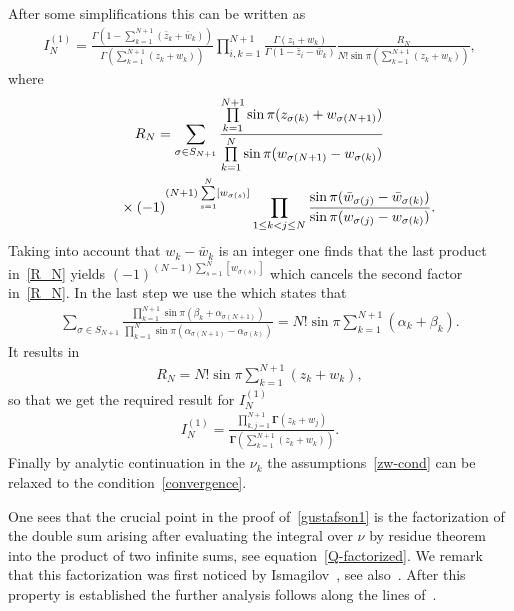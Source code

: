 \documentclass[pdftex]{sigma}
\numberwithin{equation}{section}
\begin{document}
After some simplifications this can be written as
\begin{gather*}
I_N^{(1)}=\frac{\Gamma\left(1-\sum\limits_{k=1}^{N+1}(\bar z_k+\bar w_k)\right)}{\Gamma\left(\sum\limits_{k=1}^{N+1}( z_k+ w_k)\right)}
\prod_{i,k=1}^{N+1}\frac{\Gamma(z_i+w_k)}{\Gamma(1-\bar z_i-\bar w_k)}
\frac{ R_N}{N!\sin\pi\left(\sum\limits_{k=1}^{N+1}( z_k+ w_k)\right)},
\end{gather*}
where
\begin{gather}
R_N = \sum_{\sigma\in S_{N+1}}
\frac{\prod\limits_{k=1}^{N+1}
\sin\pi(z_{\sigma(k)}+w_{\sigma(N+1)})}
{\prod\limits_{k=1}^N\sin\pi(w_{\sigma(N+1)}-w_{\sigma(k)})}
\nonumber\\
\hphantom{R_N =}{} \times(-1)^{(N+1)\sum\limits_{s=1}^N[w_{\sigma(s)}]}\prod_{1\leq k<j\leq N}
\frac{\sin\pi(\bar w_{\sigma(j)}-\bar w_{\sigma(k)})}{\sin\pi( w_{\sigma(j)}- w_{\sigma(k)})} .\label{R_N}
\end{gather}
Taking into account that $w_k-\bar w_k$ is an integer one finds that the last product in~\eqref{R_N} yields $(-1)^{(N-1)\sum\limits_{s=1}^N [w_{\sigma(s)}]}$ which cancels the second factor in~\eqref{R_N}. In the last step we use the \cite[Lemma~5.10]{Gustafson94} which states that
\begin{gather*}
\sum_{\sigma\in S_{N+1}}
\frac{\prod\limits_{k=1}^{N+1}
\sin\pi(\beta_{k}+\alpha_{\sigma(N+1)})}
{\prod\limits_{k=1}^N\sin\pi(\alpha_{\sigma(N+1)}-\alpha_{\sigma(k)})} =
N!\sin\pi \sum_{k=1}^{N+1}(\alpha_k+\beta_k).
\end{gather*}
It results in
\begin{gather*}
R_N=N!\sin\pi \sum_{k=1}^{N+1}( z_k+ w_k),
\end{gather*}
so that we get the required result for $I_N^{(1)}$
 \begin{gather*}
I_N^{(1)}=\frac{\prod\limits_{k,j=1}^{N+1}\boldsymbol{\Gamma}(z_k+ w_j)}{
\boldsymbol{\Gamma}\left(\sum\limits_{k=1}^{N+1} (z_k+w_k) \right)} .
\end{gather*}
Finally by analytic continuation in the $\nu_k$ the assumptions~\eqref{zw-cond} can be relaxed to the condition~\eqref{convergence}.

One sees that the crucial point in the proof of~\eqref{gustafson1} is the factorization of the double sum arising after evaluating the integral over $\nu$ by residue theorem into the product of two infinite sums, see equation~\eqref{Q-factorized}. We remark that this factorization was first noticed by Ismagi\-lov~\mbox{\cite{MR2265687,MR2354280}}, see also~\cite{Neretin:2019xze}. After this property is established the further analysis follows along the lines of~\cite{Gustafson94}.
\end{document}

